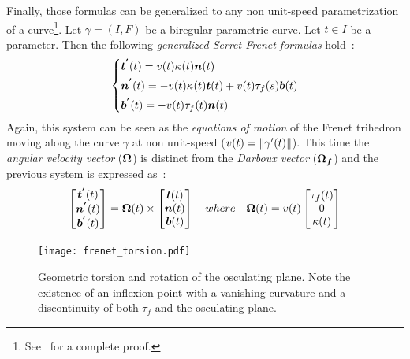 Finally, those formulas can be generalized to any non unit-speed parametrization of a curve\footnote{See~\cite[p.203]{Gray2006} for a complete proof.}. Let $\gamma = (I,F)$ be a biregular parametric curve. Let $t \in I$ be a parameter. Then the following \emph{generalized Serret-Frenet formulas} hold~:
\begin{equation}
	\left\{
	\begin{aligned}
		&\boldsymbol{t^{'}}(t) 	=  v(t) \kappa_{}(t) \boldsymbol{n}(t)\\
		&\boldsymbol{n^{'}}(t) 	=  -v(t) \kappa_{}(t) \boldsymbol{t}(t) + v(t) \tau_f(s) \boldsymbol{b}(t) \\
		&\boldsymbol{b^{'}}(t) 	=  -v(t) \tau_f(t) \boldsymbol{n}(t) \\
	\end{aligned}
	\right.
\end{equation}
Again, this system can be seen as the \emph{equations of motion} of the Frenet trihedron moving along the curve $\gamma$ at non unit-speed ($v(t) = \lVert\gamma'(t)\rVert$). This time the \emph{angular velocity vector} ($\boldsymbol{\Omega}$) is distinct from the \emph{Darboux vector} ($\boldsymbol{\Omega_f}$) and the previous system is expressed as~:
\begin{equation}
	\begin{bmatrix}		
		\boldsymbol{t^{'}}(t) \\
		\boldsymbol{n^{'}}(t) \\
		\boldsymbol{b^{'}}(t) \\
	\end{bmatrix}
	=
	\boldsymbol{\Omega}(t)
	\times
	\begin{bmatrix}		
		\boldsymbol{t}(t) \\
		\boldsymbol{n}(t) \\
		\boldsymbol{b}(t) \\
	\end{bmatrix}
	\quad where \quad
	\boldsymbol{\Omega}(t)
	=
	v(t)
	\begin{bmatrix}
		\tau_f(t) \\
		0 \\
		\kappa(t)
	\end{bmatrix}
\end{equation}


\begin{figure}[t]
	\centering
	\texttt{[image: frenet\_torsion.pdf]}
	\caption{Geometric torsion and rotation of the osculating plane. Note the existence of an inflexion point with a vanishing curvature and a discontinuity of both $\tau_f$ and the osculating plane.}
	\label{fig:3_3}
\end{figure}

